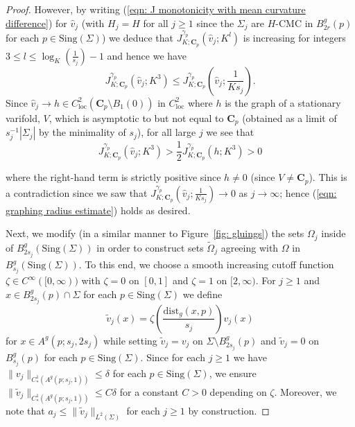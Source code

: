 \documentclass[12pt]{article}
\begin{document}
\begin{proof}
    However, by writing (\ref{eqn: J monotonicity with mean curvature difference}) for $\hat{v}_j$ (with $H_j = H$ for all $j \geq 1$ since the $\Sigma_j$ are $H$-CMC in $B_{2r}^g(p)$ for each $p \in \mathrm{Sing}(\Sigma)$) we deduce that $J^{\gamma_p}_{K;\mathbf{C}_p}(\hat{v}_j;K^l)$ is increasing for integers $3 \leq l \leq \log_K(\frac{1}{s_j}) - 1$ and hence we have
    $$J^{\gamma_p}_{K;\mathbf{C}_p}\left(\hat{v}_j;K^3\right) \leq J^{\gamma_p}_{K;\mathbf{C}_p}\left(\hat{v}_j;\frac{1}{Ks_j}\right).$$
    Since $\hat{v}_j \rightarrow h \in C^2_{\mathrm{loc}}(\mathbf{C}_p \setminus B_1(0))$ in $C^2_\mathrm{loc}$ where $h$ is the graph of a stationary varifold, $V$, which is asymptotic to but not equal to $\mathbf{C}_p$ (obtained as a limit of $s_j^{-1}|\Sigma_j|$ by the minimality of $s_j$),
    for all large $j$ we see that
    $$J^{\gamma_p}_{K;\mathbf{C}_p}\left(\hat{v}_j;K^3\right) > \frac{1}{2}J^{\gamma_p}_{K;\mathbf{C}_p}\left(h;K^3\right)  > 0$$
    
    where the right-hand term is strictly positive since $h \neq 0$ (since $V \neq \mathbf{C}_p$). This is a contradiction since we saw that $J^{\gamma_p}_{K;\mathbf{C}_p}\left(\hat{v}_j;\frac{1}{Ks_j}\right) \rightarrow 0$ as $j \rightarrow \infty$; hence (\ref{eqn: graphing radius estimate}) holds as desired.

    \bigskip

    Next, we modify (in a similar manner to Figure~\ref{fig: gluings}) the sets $\Omega_j$ inside of $B_{2s_j}^g(\mathrm{Sing}(\Sigma))$ in order to construct sets $\widetilde\Omega_j$ agreeing with $\Omega$ in $B_{s_j}^g(\mathrm{Sing}(\Sigma))$. To this end, we choose a smooth increasing cutoff function $\zeta\in C^\infty([0,\infty))$ with $\zeta = 0$ on $[0,1]$ and $\zeta = 1$ on $[2,\infty)$. For $j \geq 1$ and $x\in B_{2s_j}^g(p)\cap \Sigma$ for each $p \in \mathrm{Sing}(\Sigma)$ we define
    \begin{equation}\label{eqn: cutoff graphs}
        \widetilde v_j(x)
        = \zeta\!\left(\frac{\mathrm{dist}_g(x,p)}{s_j}\right)v_j(x)
    \end{equation}
    for $x \in A^g(p;s_j,2s_j)$ while setting $\widetilde v_j = v_j$ on $\Sigma \setminus B_{2s_j}^g(p)$ and $\widetilde v_j = 0$ on $B_{s_j}^g(p)$ for each $p \in \mathrm{Sing}(\Sigma)$. Since for each $j \geq 1$ we have $\|v_j\|_{C^1_*(A^g(p;s_j,1))} \leq \delta$ for each $p \in \mathrm{Sing}(\Sigma)$, we ensure
    $\|\widetilde v_j\|_{C^1_*(A^g(p;s_j,1))} \leq C \delta$ for a constant $C > 0$ depending on $\zeta$. Moreover, we note that $a_j \leq \|\widetilde{v}_j\|_{L^2(\Sigma)}$ for each $j \geq 1$ by construction.
    

\end{proof}
\end{document}
